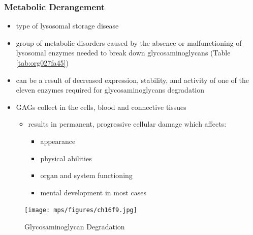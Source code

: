 \documentclass[12pt]{scrartcl}
\begin{document}
\subsubsection{Metabolic Derangement}
\label{sec:org140f87f}
\begin{itemize}
\item type of lysosomal storage disease
\item group of metabolic disorders caused by the absence or malfunctioning
of lysosomal enzymes needed to break down glycosaminoglycans (Table \ref{tab:org027fa45})
\item can be a result of decreased expression, stability, and activity of
one of the eleven enzymes required for glycosaminoglycans
degradation
\item GAGs collect in the cells, blood and connective tissues
\begin{itemize}
\item results in permanent, progressive cellular damage which affects:
\begin{itemize}
\item appearance
\item physical abilities
\item organ and system functioning
\item mental development in most cases
\end{itemize}
\end{itemize}
\end{itemize}

\begin{figure}[htbp]
\centering
\texttt{[image: mps/figures/ch16f9.jpg]}
\caption[Glycosaminoglycan Degradation]{\label{fig:orga634468}Glycosaminoglycan Degradation}
\end{figure}
\end{document}
